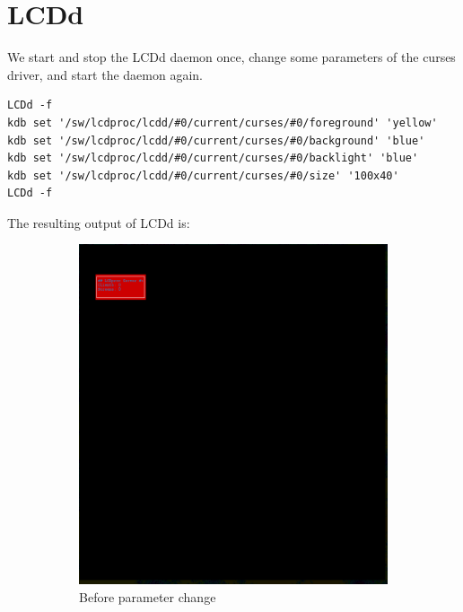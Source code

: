\documentclass[12pt]{report}
\begin{document}
\section{LCDd}
We start and stop the LCDd daemon once, change some parameters of the curses driver, and start the daemon again.
{\small
\begin{verbatim}
LCDd -f
kdb set '/sw/lcdproc/lcdd/#0/current/curses/#0/foreground' 'yellow'
kdb set '/sw/lcdproc/lcdd/#0/current/curses/#0/background' 'blue'
kdb set '/sw/lcdproc/lcdd/#0/current/curses/#0/backlight' 'blue'
kdb set '/sw/lcdproc/lcdd/#0/current/curses/#0/size' '100x40'
LCDd -f
\end{verbatim}
}

The resulting output of LCDd is:
\FloatBarrier
\begin{figure}[h!]
	\centering
	\begin{subfigure}[b]{0.4\linewidth}
		\includegraphics[width=\linewidth]{lcdd_vanilla.png}
		\caption{Before parameter change}
	\end{subfigure}
	\begin{subfigure}[b]{0.4\linewidth}

\end{subfigure}
\end{figure}
\end{document}
